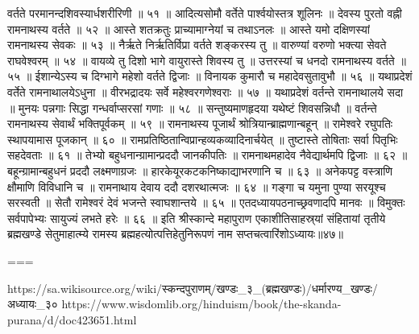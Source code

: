 वर्तते परमानन्दशिवस्यार्धशरीरिणी ॥ ५१ ॥
आदित्यसोमौ वर्तेते पार्श्वयोस्तत्र शूलिनः ॥
देवस्य पुरतो वह्नी रामनाथस्य वर्तते ॥ ५२ ॥
आस्ते शतक्रतुः प्राच्यामाग्नेयां च तथाऽनलः ॥
आस्ते यमो दक्षिणस्यां रामनाथस्य सेवकः ॥ ५३ ॥
नैर्ऋते निर्ऋतिर्विप्रा वर्तते शङ्करस्य तु ॥
वारुण्यां वरुणो भक्त्या सेवते राघवेश्वरम् ॥ ५४ ॥
वायव्ये तु दिशो भागे वायुरास्ते शिवस्य तु ॥
उत्तरस्यां च धनदो रामनाथस्य वर्तते ॥ ५५ ॥
ईशान्येऽस्य च दिग्भागे महेशो वर्तते द्विजाः ॥
विनायक कुमारौ च महादेवसुतावुभौ ॥ ५६ ॥
यथाप्रदेशं वर्तेते रामनाथालयेऽधुना ॥
वीरभद्रादयः सर्वे महेश्वरगणेश्वराः ॥ ५७ ॥
यथाप्रदेशं वर्तन्ते रामनाथालये सदा ॥
मुनयः पन्नगाः सिद्धा गन्धर्वाप्सरसां गणाः ॥ ५८ ॥
सन्तुष्यमाणहृदया यथेष्टं शिवसन्निधौ ॥
वर्तन्ते रामनाथस्य सेवार्थं भक्तिपूर्वकम् ॥ ५९ ॥
रामनाथस्य पूजार्थं श्रोत्रियान्ब्राह्मणान्बहून् ॥
रामेश्वरे रघुपतिः स्थापयामास पूजकान् ॥ ६० ॥
रामप्रतिष्ठितान्विप्रान्हव्यकव्यादिनार्चयेत् ॥
तुष्टास्ते तोषिताः सर्वा पितृभिः सहदेवताः ॥ ६१ ॥
तेभ्यो बहुधनान्ग्रामान्प्रददौ जानकीपतिः ॥
रामनाथमहादेव नैवेद्यार्थमपि द्विजाः ॥ ६२ ॥
बहून्ग्रामान्बहुधनं प्रददौ लक्ष्मणाग्रजः ॥
हारकेयूरकटकनिष्काद्याभरणानि च ॥ ६३ ॥
अनेकपट्ट वस्त्राणि क्षौमाणि विविधानि च ॥
रामनाथाय देवाय ददौ दशरथात्मजः ॥ ६४ ॥
गङ्गा च यमुना पुण्या सरयूश्च सरस्वती ॥
सेतौ रामेश्वरं देवं भजन्ते स्वाघशान्तये ॥ ६५ ॥
एतदध्यायपठनाच्छ्रवणादपि मानवः ॥
विमुक्तः सर्वपापेभ्यः सायुज्यं लभते हरेः ॥ ६६ ॥
इति श्रीस्कान्दे महापुराण एकाशीतिसाहस्र्यां संहितायां तृतीये ब्रह्मखण्डे सेतुमाहात्म्ये रामस्य ब्रह्महत्योत्पत्तिहेतुनिरूपणं नाम सप्तचत्वारिंशोऽध्यायः॥४७॥

===

https://sa.wikisource.org/wiki/स्कन्दपुराणम्/खण्डः_३_(ब्रह्मखण्डः)/धर्मारण्य_खण्डः/अध्यायः_३०
https://www.wisdomlib.org/hinduism/book/the-skanda-purana/d/doc423651.html



